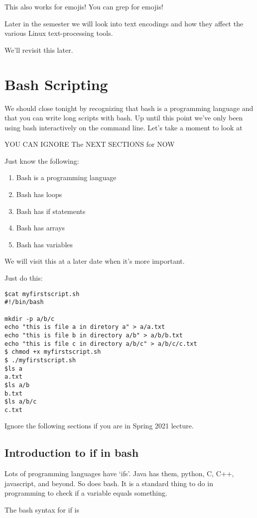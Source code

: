 \documentclass[12pt,a4paper]{article}
\begin{document}
This also works for emojis! You can grep for emojis!

Later in the semester we will look into text encodings and how they affect the
various Linux text-processing tools.

We'll revisit this later.


\section{Bash Scripting}

We should close tonight by recognizing that bash is a programming language and
that you can write long scripts with bash. Up until this point we've only been
using bash interactively on the command line. Let's take a moment to look at 

YOU CAN IGNORE The NEXT SECTIONS for NOW

Just know the following:
\begin{enumerate}
\item Bash is a programming language
\item Bash has loops
\item Bash has if statements
\item Bash has arrays
\item Bash has variables
\end{enumerate}

We will visit this at a later date when it's more important.


Just do this:
\begin{lstlisting}[style=term]
$cat myfirstscript.sh
#!/bin/bash

mkdir -p a/b/c
echo "this is file a in diretory a" > a/a.txt
echo "this is file b in directory a/b" > a/b/b.txt
echo "this is file c in directory a/b/c" > a/b/c/c.txt
$ chmod +x myfirstscript.sh
$ ./myfirstscript.sh
$ls a
a.txt
$ls a/b
b.txt
$ls a/b/c
c.txt
\end{lstlisting}

Ignore the following sections if you are in Spring 2021 lecture.

\subsection{Introduction to if in bash}
Lots of programming languages have `ifs'. Java has them, python, C, C++,
javascript, and beyond. So does bash. It is a standard thing to do in
programming to check if a variable equals something.

The bash syntax for if is 
\end{document}
